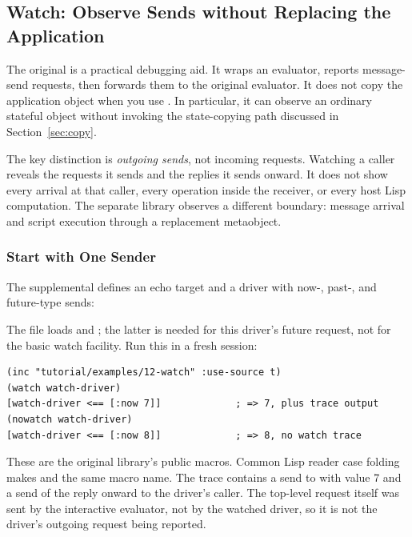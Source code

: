 \subsection{Watch: Observe Sends without Replacing the Application}
\label{sec:watch}

The original  is a practical debugging aid.
It wraps an evaluator, reports message-send requests, then forwards them
to the original evaluator. It does not copy the application object when
you use . In particular, it can observe an ordinary stateful
object without invoking the state-copying path discussed in
Section~\ref{sec:copy}.

The key distinction is \emph{outgoing sends}, not incoming requests.
Watching a caller reveals the requests it sends and the replies it sends
onward. It does not show every arrival at that caller, every operation
inside the receiver, or every host Lisp computation. The separate
 library observes a different boundary: message arrival and
script execution through a replacement metaobject.

\subsubsection{Start with One Sender}

The supplemental  defines
an echo target and a driver with now-, past-, and future-type sends:


The file loads  and ; the latter is needed for
this driver's future request, not for the basic watch facility.
Run this in a fresh session:

\begin{codeblock}
\begin{lstlisting}
(inc "tutorial/examples/12-watch" :use-source t)
(watch watch-driver)
[watch-driver <== [:now 7]]             ; => 7, plus trace output
(nowatch watch-driver)
[watch-driver <== [:now 8]]             ; => 8, no watch trace
\end{lstlisting}
\end{codeblock}

These are the original library's public macros. Common Lisp reader case
folding makes  and  the same macro name.
The trace contains a send to  with value 7 and a send
of the reply onward to the driver's caller. The top-level request
\code{[:now 7]} itself was sent by the interactive evaluator, not by the
watched driver, so it is not the driver's outgoing request being reported.


